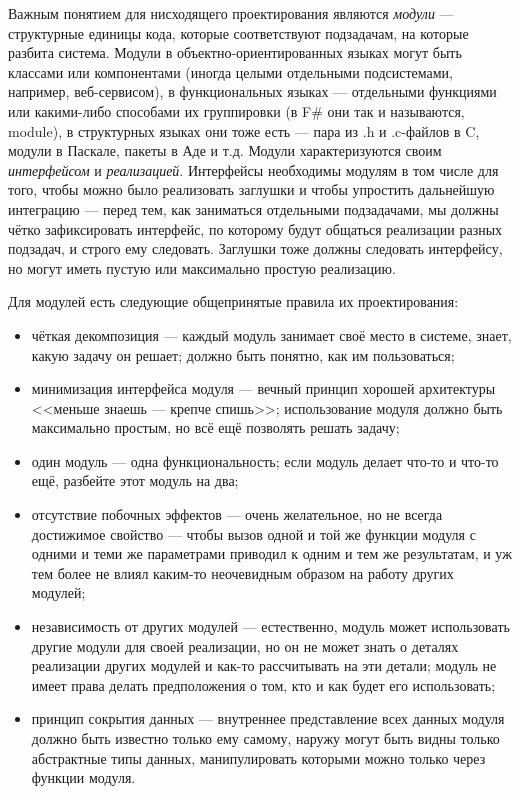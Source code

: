 \documentclass{../text-style}
\begin{document}
Важным понятием для нисходящего проектирования являются \textit{модули} --- структурные единицы кода, которые соответствуют подзадачам, на которые разбита система. Модули в объектно-ориентированных языках могут быть классами или компонентами (иногда целыми отдельными подсистемами, например, веб-сервисом), в функциональных языках --- отдельными функциями или какими-либо способами их группировки (в F\# они так и называются, module), в структурных языках они тоже есть --- пара из .h и .c-файлов в C, модули в Паскале, пакеты в Аде и т.д. Модули характеризуются своим \textit{интерфейсом} и \textit{реализацией}. Интерфейсы необходимы модулям в том числе для того, чтобы можно было реализовать заглушки и чтобы упростить дальнейшую интеграцию --- перед тем, как заниматься отдельными подзадачами, мы должны чётко зафиксировать интерфейс, по которому будут общаться реализации разных подзадач, и строго ему следовать. Заглушки тоже должны следовать интерфейсу, но могут иметь пустую или максимально простую реализацию.

Для модулей есть следующие общепринятые правила их проектирования:

\begin{itemize}
    \item чёткая декомпозиция --- каждый модуль занимает своё место в системе, знает, какую задачу он решает; должно быть понятно, как им пользоваться;
    \item минимизация интерфейса модуля --- вечный принцип хорошей архитектуры <<меньше знаешь --- крепче спишь>>; использование модуля должно быть максимально простым, но всё ещё позволять решать задачу;
    \item один модуль --- одна функциональность; если модуль делает что-то и что-то ещё, разбейте этот модуль на два;
    \item отсутствие побочных эффектов --- очень желательное, но не всегда достижимое свойство --- чтобы вызов одной и той же функции модуля с одними и теми же параметрами приводил к одним и тем же результатам, и уж тем более не влиял каким-то неочевидным образом на работу других модулей;
    \item независимость от других модулей --- естественно, модуль может использовать другие модули для своей реализации, но он не может знать о деталях реализации других модулей и как-то рассчитывать на эти детали; модуль не имеет права делать предположения о том, кто и как будет его использовать;
    \item принцип сокрытия данных --- внутреннее представление всех данных модуля должно быть известно только ему самому, наружу могут быть видны только абстрактные типы данных, манипулировать которыми можно только через функции модуля.
\end{itemize}
\end{document}
